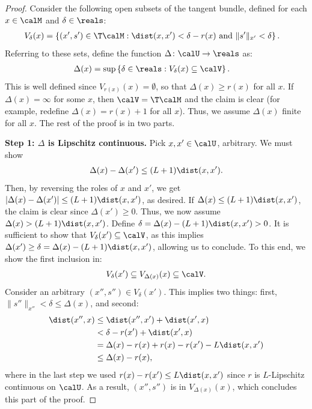 \begin{proof}
	Consider the following open subsets of the tangent bundle, defined for each $x \in \calM$ and $\delta \in \reals$:
	\begin{align*}
	V_\delta(x) & = \left\{ (x', s') \in \T\calM : \dist(x, x') < \delta - r(x) \textrm{ and } \|s'\|_{x'} < \delta \right\}.
	\end{align*}
	Referring to these sets, define the function $\Delta \colon \calU \to \reals$ as:
	\begin{align*}
	\Delta(x) & = \sup\left\{ \delta \in \reals : V_\delta(x) \subseteq \calV \right\}.
	\end{align*}
	This is well defined since $V_{r(x)}(x) = \emptyset$, so that $\Delta(x) \geq r(x)$ for all $x$.
	If $\Delta(x) = \infty$ for some $x$, then $\calV = \T\calM$ and the claim is clear (for example, redefine $\Delta(x) = r(x) + 1$ for all $x$). Thus, we assume $\Delta(x)$ finite for all $x$. The rest of the 	proof is in two parts.
	
	\textbf{Step 1: $\Delta$ is Lipschitz continuous.} Pick $x, x' \in \calU$, arbitrary. We must show
	\begin{align*}
	\Delta(x) - \Delta(x') \leq (L+1) \dist(x, x').
	\end{align*}
	Then, by reversing the roles of $x$ and $x'$, we get $|\Delta(x) - \Delta(x')| \leq (L+1) \dist(x, x')$, as desired. If $\Delta(x) \leq (L+1) \dist(x, x')$, the claim is clear since $\Delta(x') \geq 0$. Thus, we now assume $\Delta(x) > (L+1) \dist(x, x')$. Define $\delta = \Delta(x) - (L+1) \dist(x, x') > 0$. It is sufficient to show that $V_\delta(x') \subseteq \calV$, as this implies $\Delta(x') \geq \delta = \Delta(x) - (L+1) \dist(x, x')$, allowing us to conclude. To this end, we show the first inclusion in:
	\begin{align*}
	V_\delta(x') \subseteq V_{\Delta(x)}(x) \subseteq \calV.
	\end{align*}
	Consider an arbitrary $(x'', s'') \in V_\delta(x')$. This implies two things: first, $\|s''\|_{x''} < \delta \leq \Delta(x)$, and second:
	\begin{align*}
	\dist(x'', x) & \leq \dist(x'', x') + \dist(x', x) \\ & < \delta - r(x') + \dist(x', x) \\ & = \Delta(x) - r(x) + r(x) - r(x') - L \dist(x, x') \\ & \leq \Delta(x) - r(x),
	\end{align*}
	where in the last step we used $r(x) - r(x') \leq L\dist(x, x')$ since $r$ is $L$-Lipschitz continuous on $\calU$.
	As a result, $(x'', s'')$ is in $V_{\Delta(x)}(x)$, which concludes this part of the proof.
	

\end{proof}
